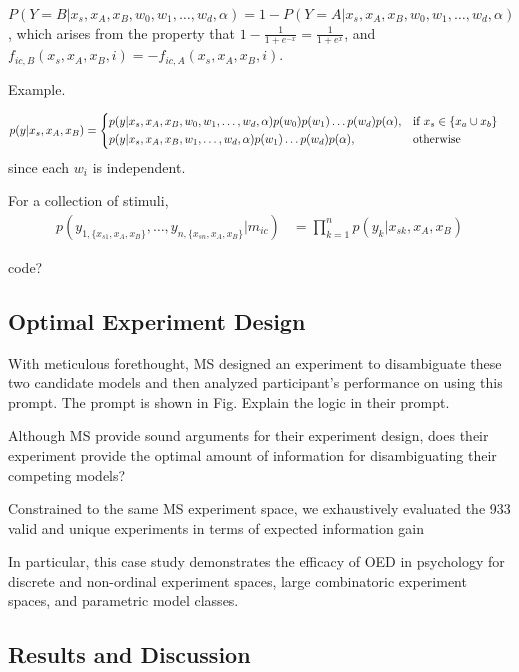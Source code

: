 \documentclass{article}
\begin{document}
$P(Y=B| x_s, x_A, x_B, w_0, w_1, \dots, w_d, \alpha) = 1- P(Y=A| x_s, x_A, x_B, w_0, w_1, \dots, w_d, \alpha)$, which arises from the property that $1-\frac{1}{1+e^{-x}} = \frac{1}{1+e^x}$, and $f_{ic,B}(x_s, x_A, x_B, i) = -f_{ic,A}(x_s, x_A, x_B, i)$.

Example.

\begin{align}
    p(y | x_s, x_A, x_B) &=
        \begin{dcases}
            p(y|x_s, x_A, x_B, w_0, w_1, \dots, w_d, \alpha) p(w_0) p(w_1) \dots p(w_d) p(\alpha), & \text{if } x_s \in \{x_a \cup x_b\}\\
            p(y|x_s, x_A, x_B, w_1, \dots, w_d, \alpha) p(w_1) \dots p(w_d) p(\alpha), & \text{otherwise}
        \end{dcases}
\end{align}
since each $w_i$ is independent.

For a collection of stimuli,
\begin{align}
    p(y_{1,\{x_{s1}, x_A, x_B\}}, \dots, y_{n,\{x_{sn}, x_A, x_B\}} | m_{ic}) &=  \prod\limits_{k=1}^n p(y_k|x_{sk}, x_A, x_B)
\end{align}

code?

\subsection{Optimal Experiment Design}
With meticulous forethought, MS designed an experiment to disambiguate these two candidate models and then analyzed participant's performance on using this prompt. The prompt is shown in Fig. Explain the logic in their prompt.

Although MS provide sound arguments for their experiment design, does their experiment provide the optimal amount of information for disambiguating their competing models?

Constrained to the same MS experiment space, we exhaustively evaluated the 933 valid and unique experiments in terms of expected information gain

In particular, this case study demonstrates the efficacy of OED in psychology for discrete and non-ordinal experiment spaces, large combinatoric experiment spaces, and parametric model classes.

\subsection{Results and Discussion}
\end{document}

